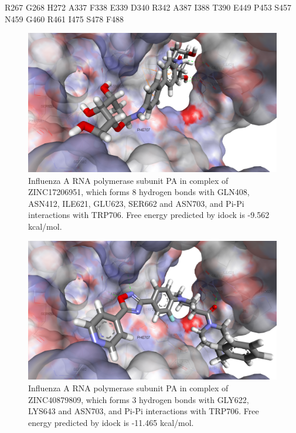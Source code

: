 R267
G268
H272
A337
F338
E339
D340
R342
A387
I388
T390
E449
P453
S457
N459
G460
R461
I475
S478
F488

\begin{figure}
\centering
\includegraphics[width=\linewidth]{../influenza/2ZNL-ZINC17206951.png}
\caption{Influenza A RNA polymerase subunit PA in complex of ZINC17206951, which forms 8 hydrogen bonds with GLN408, ASN412, ILE621, GLU623, SER662 and ASN703, and Pi-Pi interactions with TRP706. Free energy predicted by idock is -9.562 kcal/mol.}
\label{influenza:2ZNL-ZINC17206951}
\end{figure}

\begin{figure}
\centering
\includegraphics[width=\linewidth]{../influenza/2ZNL-ZINC40879809.png}
\caption{Influenza A RNA polymerase subunit PA in complex of ZINC40879809, which forms 3 hydrogen bonds with GLY622, LYS643 and ASN703, and Pi-Pi interactions with TRP706. Free energy predicted by idock is -11.465 kcal/mol.}
\label{influenza:2ZNL-ZINC40879809}
\end{figure}

